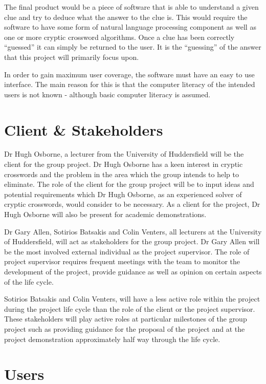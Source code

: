 The final product would be a piece of software that is able to understand a
given clue and try to deduce what the answer to the clue is. This would require
the software to have some form of natural language processing component as well
as one or more cryptic crossword algorithms. Once a clue has been correctly
``guessed'' it can simply be returned to the user. It is the ``guessing'' of
the answer that this project will primarily focus upon.

In order to gain maximum user coverage, the software must have an easy to use
interface. The main reason for this is that the computer literacy of the
intended users is not known - although basic computer literacy is assumed.


\section{Client \& Stakeholders}

Dr Hugh Osborne, a lecturer from the University of Huddersfield will be  the
client for the group project. Dr Hugh Osborne has a keen interest in cryptic
crosswords and the problem in the area which the group intends to help to
eliminate. The role of the client for the group project will be to input ideas
and potential requirements which Dr Hugh Osborne, as an experienced solver of
cryptic crosswords, would consider to be necessary. As a client for the project,
Dr Hugh Osborne will also be present for academic demonstrations.

Dr Gary Allen, Sotirios Batsakis and Colin Venters, all lecturers at the
University of Huddersfield, will act as stakeholders for the group project. Dr
Gary Allen will be the most involved external individual as the project
supervisor. The role of project supervisor requires frequent meetings with the
team to monitor the development of the project, provide guidance as well as
opinion on certain aspects of the life cycle.

Sotirios Batsakis and Colin Venters, will have a less active role within the
project during the project life cycle than the role of the client or the project
supervisor.  These stakeholders will play active roles at particular milestones
of the group  project such as providing guidance for the proposal of the project
and at the  project demonstration approximately half way through the life cycle.


\section{Users} 

